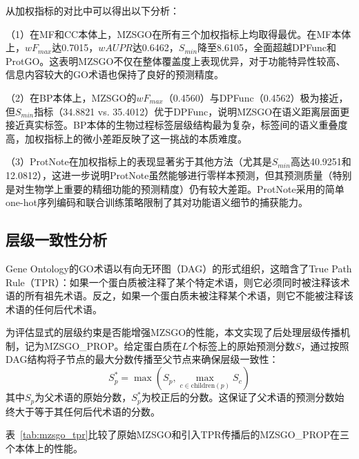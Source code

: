 从加权指标的对比中可以得出以下分析：

（1）在MF和CC本体上，MZSGO在所有三个加权指标上均取得最优。在MF本体上，$wF_{max}$达0.7015，$wAUPR$达0.6462，$S_{min}$降至8.6105，全面超越DPFunc和ProtGO。这表明MZSGO不仅在整体覆盖度上表现优异，对于功能特异性较高、信息内容较大的GO术语也保持了良好的预测精度。

（2）在BP本体上，MZSGO的$wF_{max}$（0.4560）与DPFunc（0.4562）极为接近，但$S_{min}$指标（34.8821 vs. 35.4012）优于DPFunc，说明MZSGO在语义距离层面更接近真实标签。BP本体的生物过程标签层级结构最为复杂，标签间的语义重叠度高，加权指标上的微小差距反映了这一挑战的本质难度。

（3）ProtNote在加权指标上的表现显著劣于其他方法（尤其是$S_{min}$高达40.9251和12.0812），这进一步说明ProtNote虽然能够进行零样本预测，但其预测质量（特别是对生物学上重要的精细功能的预测精度）仍有较大差距。ProtNote采用的简单one-hot序列编码和联合训练策略限制了其对功能语义细节的捕获能力。

\subsection{层级一致性分析}

Gene Ontology的GO术语以有向无环图（DAG）的形式组织，这暗含了True Path Rule（TPR）\cite{notaro2021hemdag}：如果一个蛋白质被注释了某个特定术语，则它必须同时被注释该术语的所有祖先术语。反之，如果一个蛋白质未被注释某个术语，则它不能被注释该术语的任何后代术语。

为评估显式的层级约束是否能增强MZSGO的性能，本文实现了后处理层级传播机制，记为MZSGO\_PROP。给定蛋白质在$L$个标签上的原始预测分数$S$，通过按照DAG结构将子节点的最大分数传播至父节点来确保层级一致性：
\begin{equation}
    S_{p}^* = \max \left( S_p, \max_{c \in \text{children}(p)} S_c \right)
\end{equation}
其中$S_p$为父术语的原始分数，$S_{p}^*$为校正后的分数。这保证了父术语的预测分数始终大于等于其任何后代术语的分数。

表~\ref{tab:mzsgo_tpr}比较了原始MZSGO和引入TPR传播后的MZSGO\_PROP在三个本体上的性能。

